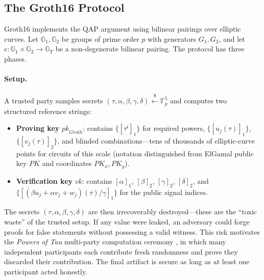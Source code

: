 \subsection{The Groth16 Protocol}

Groth16 implements the QAP argument using bilinear pairings over elliptic curves. Let $\mathbb{G}_1, \mathbb{G}_2$ be groups of prime order $p$ with generators $G_1, G_2$, and let $e: \mathbb{G}_1 \times \mathbb{G}_2 \rightarrow \mathbb{G}_T$ be a non-degenerate bilinear pairing. The protocol has three phases.

\paragraph{Setup.}
A trusted party samples secrets $(\tau, \alpha, \beta, \gamma, \delta) \overset{\$}{\leftarrow} \mathbb{F}_p^5$ and computes two structured reference strings:
\begin{itemize}
    \item \textbf{Proving key} $\mathit{pk}_{\mathit{Groth}}$: contains $\{[\tau^i]_1\}$ for required powers, $\{[u_j(\tau)]_1\}$, $\{[v_j(\tau)]_2\}$, and blinded combinations---tens of thousands of elliptic-curve points for circuits of this scale (notation distinguished from ElGamal public key $\mathit{PK}$ and coordinates $\mathit{PK}_x,\mathit{PK}_y$).
    \item \textbf{Verification key} $\mathit{vk}$: contains $[\alpha]_1$, $[\beta]_2$, $[\gamma]_2$, $[\delta]_2$, and $\{[(\beta u_j + \alpha v_j + w_j)(\tau)/\gamma]_1\}$ for the public signal indices.
\end{itemize}

The secrets $(\tau, \alpha, \beta, \gamma, \delta)$ are then irrecoverably destroyed---these are the ``toxic waste'' of the trusted setup. If any value were leaked, an adversary could forge proofs for false statements without possessing a valid witness. This risk motivates the \emph{Powers of Tau} multi-party computation ceremony \cite{powersoftau2017}, in which many independent participants each contribute fresh randomness and prove they discarded their contribution. The final artifact is secure as long as at least one participant acted honestly.

